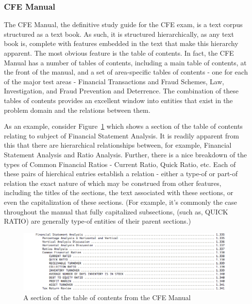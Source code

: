 \subsubsection{CFE Manual}

The CFE Manual, the definitive study guide for the CFE exam, is a text corpus structured as a text book.
As such, it is structured hierarchically, as any text book is, complete with features embedded in the text
that make this hierarchy apparent.  The most obvious feature is the table of contents.  In fact, the CFE 
Manual has a number of tables of contents, including a main table of contents, at the front of the manual,
and a set of area-specific tables of contents - one for each of the major test areas - Financial Transactions
and Fraud Schemes, Law, Investigation, and Fraud Prevention and Deterrence.  The combination of these
tables of contents provides an excellent window into entities that exist in the problem domain and the 
relations between them.  

As an example, consider Figure~\ref{fig:cfe_manual_toc} which shows a section of the table of contents 
relating to subject of Financial Statement Analysis.  It is readily apparent from this that there are hierarchical relationships between, for example, Financial Statement Analysis and Ratio Analysis.  Further,
there is a nice breakdown of the types of Common Financial Ratios - Current Ratio, Quick Ratio, etc.  Each 
of these pairs of hierchical entries establish a relation - either a type-of or part-of relation the exact
nature of which may be construed from other features, including the titles of the sections, the text
associated with these sections, or even the capitalization of these sections.  (For example, it's commonly
the case throughout the manual that fully capitalized subsections, (such as, QUICK RATIO) are generally type-of entities of their parent sections.)

\begin{figure}
\centering
\vspace{2.0in}
\includegraphics[width=150mm]{cfe_manual_toc.png}
\caption{A section of the table of contents from the CFE Manual}
\label{fig:cfe_manual_toc}
\end{figure}


